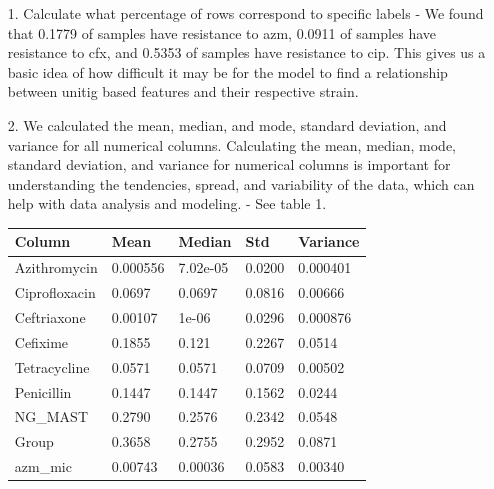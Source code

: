 \documentclass[manuscript,screen,review, nonacm]{acmart}
\begin{document}
\begin{itemize}
    \item[1.] Calculate what percentage of rows correspond to specific labels - We found that 0.1779 of samples have resistance to azm, 
    0.0911 of samples have resistance to cfx, and 0.5353 of samples have resistance to cip. This gives us a basic idea of how difficult it may be for the model to find a relationship between unitig based features and their respective strain.
    \item[2.] We calculated the mean, median, and mode, standard deviation, and variance for all numerical columns. 
    Calculating the mean, median, mode, standard deviation, and variance for numerical columns is important for understanding the tendencies, spread, and variability of the data,
    which can help with data analysis and modeling. - See table 1.
    \begin{table}[H]
        \centering
        \begin{tabular}{|l|l|l|l|l|}
        \hline
        \textbf{Column}       & \textbf{Mean}    & \textbf{Median}  & \textbf{Std}     & \textbf{Variance} \\ \hline
        Azithromycin          & 0.000556         & 7.02e-05         & 0.0200           & 0.000401          \\ \hline
        Ciprofloxacin         & 0.0697           & 0.0697           & 0.0816           & 0.00666           \\ \hline
        Ceftriaxone           & 0.00107          & 1e-06            & 0.0296           & 0.000876          \\ \hline
        Cefixime              & 0.1855           & 0.121            & 0.2267           & 0.0514            \\ \hline
        Tetracycline          & 0.0571           & 0.0571           & 0.0709           & 0.00502           \\ \hline
        Penicillin            & 0.1447           & 0.1447           & 0.1562           & 0.0244            \\ \hline
        NG\_MAST              & 0.2790           & 0.2576           & 0.2342           & 0.0548            \\ \hline
        Group                 & 0.3658           & 0.2755           & 0.2952           & 0.0871            \\ \hline
        azm\_mic              & 0.00743          & 0.00036          & 0.0583           & 0.00340           \\ \hline

\end{tabular}
\end{table}
\end{itemize}
\end{document}
